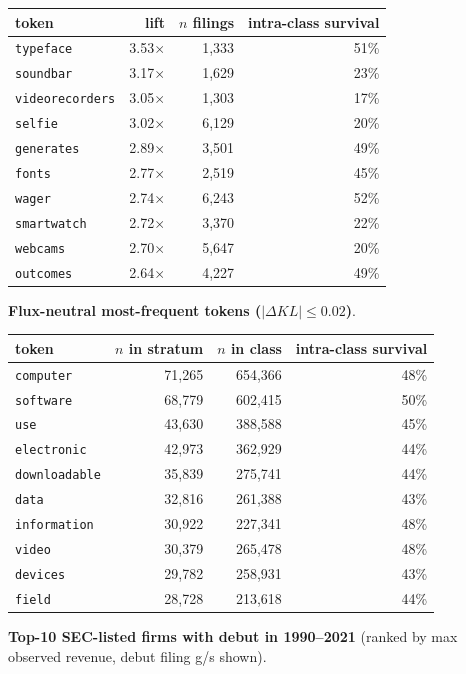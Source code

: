 \begin{tabular}{lrrr}
\toprule
token & lift & $n$ filings & intra-class survival \\
\midrule
\texttt{typeface} & 3.53$\times$ & 1,333 & 51\% \\
\texttt{soundbar} & 3.17$\times$ & 1,629 & 23\% \\
\texttt{videorecorders} & 3.05$\times$ & 1,303 & 17\% \\
\texttt{selfie} & 3.02$\times$ & 6,129 & 20\% \\
\texttt{generates} & 2.89$\times$ & 3,501 & 49\% \\
\texttt{fonts} & 2.77$\times$ & 2,519 & 45\% \\
\texttt{wager} & 2.74$\times$ & 6,243 & 52\% \\
\texttt{smartwatch} & 2.72$\times$ & 3,370 & 22\% \\
\texttt{webcams} & 2.70$\times$ & 5,647 & 20\% \\
\texttt{outcomes} & 2.64$\times$ & 4,227 & 49\% \\
\bottomrule
\end{tabular}

\textbf{Flux-neutral most-frequent tokens ($|\Delta KL|\leq 0.02$)}.

\begin{tabular}{lrrr}
\toprule
token & $n$ in stratum & $n$ in class & intra-class survival \\
\midrule
\texttt{computer} & 71,265 & 654,366 & 48\% \\
\texttt{software} & 68,779 & 602,415 & 50\% \\
\texttt{use} & 43,630 & 388,588 & 45\% \\
\texttt{electronic} & 42,973 & 362,929 & 44\% \\
\texttt{downloadable} & 35,839 & 275,741 & 44\% \\
\texttt{data} & 32,816 & 261,388 & 43\% \\
\texttt{information} & 30,922 & 227,341 & 48\% \\
\texttt{video} & 30,379 & 265,478 & 48\% \\
\texttt{devices} & 29,782 & 258,931 & 43\% \\
\texttt{field} & 28,728 & 213,618 & 44\% \\
\bottomrule
\end{tabular}

\textbf{Top-10 SEC-listed firms with debut in 1990--2021} (ranked by max observed revenue, debut filing g/s shown).

